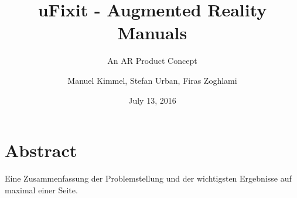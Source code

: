 \documentclass[doctype=Studienarbeit]{ldvbook}
\begin{document}
\subject{Advanced Seminar}
\title{uFixit - Augmented Reality Manuals}
\subtitle{An AR Product Concept}
\author{Manuel Kimmel, Stefan Urban, Firas Zoghlami}
\date{July 13, 2016}

\maketitle


\chapter*{Abstract}

Eine Zusammenfassung der Problemstellung und der wichtigsten
Ergebnisse auf maximal einer Seite.


\tableofcontents









\end{document}

